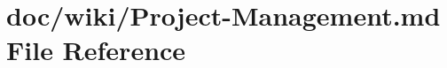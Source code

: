 \hypertarget{_project-_management_8md}{}\section{doc/wiki/\+Project-\/\+Management.md File Reference}
\label{_project-_management_8md}
